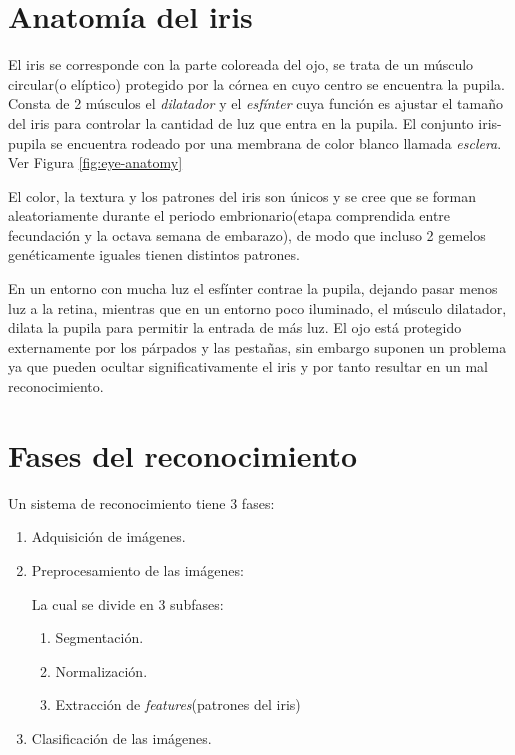 
\section{Anatomía del iris}
El iris se corresponde con la parte coloreada del ojo, se trata de un músculo circular(o elíptico) protegido por la córnea en cuyo centro se encuentra la pupila. Consta de 2 músculos el \emph{dilatador} y el \emph{esfínter} cuya función es ajustar el tamaño del iris para controlar la cantidad de luz que entra en la pupila.
El conjunto iris-pupila se encuentra rodeado por una membrana de color blanco llamada \emph{esclera}. Ver Figura \ref{fig:eye-anatomy}

El color, la textura y los patrones del iris son únicos y se cree que se forman aleatoriamente durante el periodo embrionario(etapa comprendida entre fecundación y la octava semana de embarazo), de modo que incluso 2 gemelos genéticamente iguales tienen distintos patrones.

En un entorno con mucha luz el esfínter contrae la pupila, dejando pasar menos luz a la retina, mientras que en un entorno poco iluminado, el músculo dilatador, dilata la pupila para permitir la entrada de más luz.
El ojo está protegido externamente por los párpados y las pestañas, sin embargo suponen un problema ya que pueden ocultar significativamente el iris y por tanto resultar en un mal reconocimiento.
{}
\section{Fases del reconocimiento}
Un sistema de reconocimiento tiene 3 fases:
\begin{enumerate}
	\item Adquisición de imágenes.
	\item Preprocesamiento de las imágenes:
	
	La cual se divide en 3 subfases:
	\begin{enumerate}
		\item Segmentación.
		\item Normalización.
		\item Extracción de \emph{features}(patrones del iris)
	\end{enumerate}
	\item Clasificación de las imágenes.

\end{enumerate}

